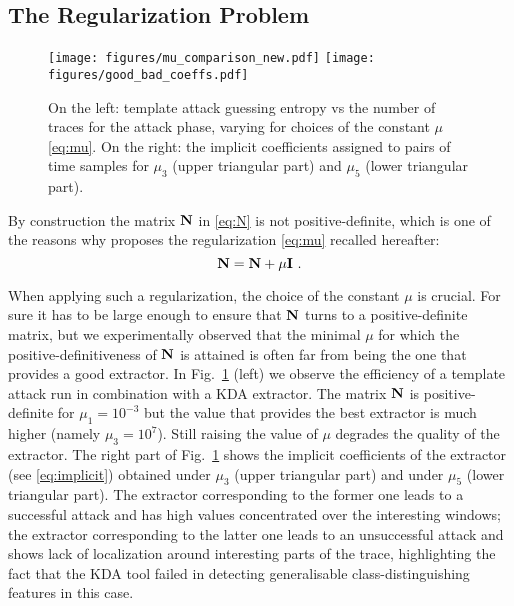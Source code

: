 \subsection{The Regularization Problem}\label{sec:mu}


\begin{figure}
\texttt{[image: figures/mu\_comparison\_new.pdf]} 
\texttt{[image: figures/good\_bad\_coeffs.pdf]} 
\caption{On the left: template attack guessing entropy vs the number of traces for the attack phase, varying for choices of the constant $\mu$  \eqref{eq:mu}. On the right: the implicit coefficients assigned to pairs of time samples for $\mu_3$ (upper triangular part) and $\mu_5$ (lower triangular part). }\label{fig:mu}
\end{figure}


By construction the matrix $\textbf{N}$ in \eqref{eq:N} is not positive-definite, which is one of the reasons why \cite{scholkopf1999fisher} proposes the regularization \eqref{eq:mu} recalled hereafter:
\begin{equation}
\textbf{N} = \textbf{N} + \mu\textbf{I} \mbox{ .}
\end{equation}

When applying such a regularization, the choice of the constant $\mu$ is crucial. For sure it has to be large enough to ensure that $\textbf{N}$ turns to a positive-definite matrix, but we experimentally observed  that the minimal $\mu$ for which the positive-definitiveness of $\textbf{N}$ is attained is often far from  being the one that provides a good extractor. In Fig.~\ref{fig:mu} (left) we observe the efficiency of a template attack run in combination with a KDA extractor. The matrix $\textbf{N}$ is positive-definite for $\mu_1 = 10^{-3}$ but the value that provides the best extractor is much higher (namely $\mu_3 = 10^{7}$). Still raising the value of $\mu$ degrades the quality of the extractor. The right part of Fig.~\ref{fig:mu} shows the implicit coefficients of the extractor (see \eqref{eq:implicit}) obtained under $\mu_3$ (upper triangular part) and under $\mu_5$ (lower triangular part). The extractor corresponding to the former one leads to a successful attack and has high values concentrated over the interesting windows; the extractor corresponding to the latter one leads to an unsuccessful attack and shows lack of localization around interesting parts of the trace, highlighting the fact that the KDA tool failed in detecting generalisable class-distinguishing features in this case.\\

